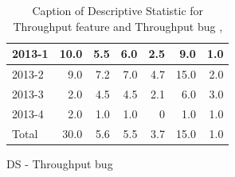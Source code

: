 \documentclass[UKenglish]{ifimaster}  %
\begin{document}
\begin{appendices}
\begin{table}[!htbp]
\begin{adjustwidth}{-2.5cm}{}
\begin{subfigure}[b]{0.3\textwidth}
{\begin{tabular}{ | l | r | r | r | r | r | r | }
2013-1 & 10.0 & 5.5 & 6.0 & 2.5 & 9.0 & 1.0\\ \hline
2013-2 & 9.0 & 7.2 & 7.0 & 4.7 & 15.0 & 2.0\\ \hline
2013-3 & 2.0 & 4.5 & 4.5 & 2.1 & 6.0 & 3.0\\ \hline
2013-4 & 2.0 & 1.0 & 1.0 & 0 & 1.0 & 1.0\\ \hline
Total & 30.0 & 5.6 & 5.5 & 3.7 & 15.0 & 1.0\\ \hline
\end{tabular}
}
\caption{DS - Throughput bug}
 \label{DS:TPB:4}
\end{subfigure}
\end{adjustwidth}
\caption[Optional caption for list of figures]{Caption of Descriptive Statistic for Throughput feature and Throughput bug  , }
\label{DS:4:2}
\end{table}



\begin{table}[!htbp]
  \begin{adjustwidth}{-1.5cm}{}
\begin{subfigure}[b]{0.7\textwidth}
\end{subfigure}
\end{adjustwidth}
\end{table}
\end{appendices}
\end{document}
